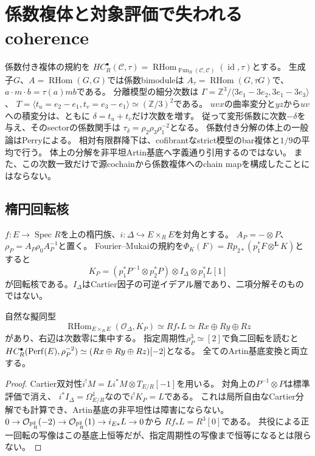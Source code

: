 \section{係数複体と対象評価で失われるcoherence}
係数付き複体の規約を
$HC_R^\bullet(\mathcal C,\tau)=\operatorname{RHom}_{\operatorname{Fun}_R(\mathcal C,\mathcal C)}
(\operatorname{id},\tau)$とする。
生成子$G$、$A=\operatorname{RHom}(G,G)$では係数bimoduleは
$A_\tau=\operatorname{RHom}(G,\tau G)$で、$a\cdot m\cdot b=\tau(a)mb$である。
分離模型の細分次数は
$\Gamma=\mathbb Z^3/\langle3e_1-3e_2,3e_1-3e_3\rangle$、
$T=\langle t_u=e_2-e_1,t_v=e_3-e_1\rangle\simeq(\mathbb Z/3)^2$である。
$uvx$の曲率変分と$yz$から$uv$への積変分は、ともに
$\delta=t_u+t_v$だけ次数を増す。
従って変形係数に次数$-\delta$を与え、そのsectorの係数関手は
$\tau_\delta=\rho_2\rho_3\rho_1^{-2}$となる。
係数付き分解の体上の一般論はPerry\cite{Perry}による。
相対有限群降下は、cofibrantなstrict模型のbar複体と$1/9$の平均で行う。
体上の分解を非平坦Artin基底へ字義通り引用するのではない。
また、この次数一致だけで源cochainから係数複体へのchain mapを構成したことにはならない。

\subsection{楕円回転核}
$f:E\to\operatorname{Spec}R$を上の楕円族、$i:\Delta\hookrightarrow E\times_RE$を対角とする。
$A_P=-\otimes P$、$\rho_P=A_P\rho_0A_P^{-1}$と置く。
Fourier--Mukaiの規約を$\Phi_K(F)=Rp_{2*}(p_1^*F\otimes^{\mathbf L}K)$とすると
\[
 K_P=(p_1^*P^{-1}\otimes p_2^*P)\otimes I_\Delta\otimes p_1^*L[1]
\]
が回転核である。$I_\Delta$はCartier因子の可逆イデアル層であり、二項分解そのものではない。
\begin{proposition}
自然な擬同型
\[
 \operatorname{RHom}_{E\times_RE}(\mathcal O_\Delta,K_P)
 \simeq Rf_*L\simeq Rx\oplus Ry\oplus Rz
\]
があり、右辺は次数零に集中する。
指定周期性$\rho_P^3\simeq[2]$で負二回転を読むと
$HC_R^\bullet(\operatorname{Perf}(E),\rho_P^{-2})\simeq(Rx\oplus Ry\oplus Rz)[-2]$となる。
全てのArtin基底変換と両立する。
\end{proposition}
\begin{proof}
Cartier双対性$i^!M=Li^*M\otimes T_{E/R}[-1]$を用いる。
対角上の$P^{-1}\otimes P$は標準評価で消え、
$i^*I_\Delta=\Omega^1_{E/R}$なので$i^!K_P=L$である。
これは局所自由なCartier分解でも計算でき、Artin基底の非平坦性は障害にならない。
$0\to\mathcal O_{\mathbb P^2_R}(-2)\to\mathcal O_{\mathbb P^2_R}(1)\to i_{E*}L\to0$から
$Rf_*L=R^3[0]$である。
共役による正一回転の写像はこの基底上恒等だが、指定周期性の写像まで恒等になるとは限らない。
\end{proof}

